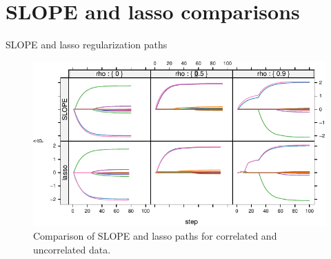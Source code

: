 \documentclass[10pt]{beamer}
\begin{document}
\section{SLOPE and lasso comparisons}

\begin{frame}{SLOPE and lasso regularization paths}
    \begin{figure}
        \centering
        \includegraphics[width=\linewidth]{figures/lassoslopepath.pdf}
        \caption{Comparison of SLOPE and lasso paths for correlated and uncorrelated data.}
    \end{figure}
\end{frame}
\end{document}
